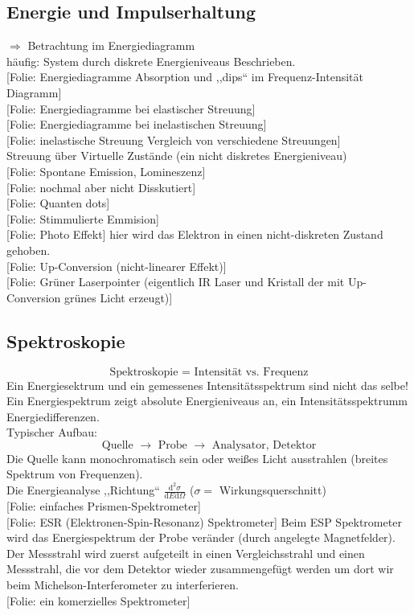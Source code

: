 \documentclass[titlepage,11pt,a4paper,ngerman]{report}
\newcommand{\tx}[1]{\textrm{#1}}
\newcommand{\dd}{\tx{d}}
\newcommand{\prd}[2]{\frac{\tx{d} #1}{\tx{d} #2}}
\newcommand{\folie}[1]{\color{gray}[Folie: #1]\color{black}}
\newcommand{\lcom}[1]{\color{MidnightBlue}#1\color{black}}
\begin{document}
\subsection{Energie und Impulserhaltung}
$ \Rightarrow $ Betrachtung im Energiediagramm\\[5pt]
häufig: System durch diskrete Energieniveaus Beschrieben.\\[5pt]
\folie{Energiediagramme Absorption und ,,dips`` im Frequenz-Intensität Diagramm}\\
\folie{Energiediagramme bei elastischer Streuung}\\
\folie{Energiediagramme bei inelastischen Streuung}\\
\folie{inelastische Streuung Vergleich von verschiedene Streuungen}\\
Streuung über Virtuelle Zustände (ein nicht diskretes Energieniveau)\\
\folie{Spontane Emission, Lomineszenz}\\
\folie{nochmal aber nicht Disskutiert}\\
\folie{Quanten dots}\\
\folie{Stimmulierte Emmision}\\
\folie{Photo Effekt} hier wird das Elektron in einen nicht-diskreten Zustand gehoben.\\
\folie{Up-Conversion (nicht-linearer Effekt)}\\
\folie{Grüner Laserpointer (eigentlich IR Laser und Kristall der mit Up-Conversion grünes Licht erzeugt)}\\


\subsection{Spektroskopie}

\begin{equation*}
\tx{Spektroskopie } = \tx{ Intensität vs. Frequenz}
\end{equation*}
\lcom{Ein Energiesektrum und ein gemessenes Intensitätsspektrum sind nicht das selbe! Ein Energiespektrum zeigt absolute Energieniveaus an, ein Intensitätsspektrumm Energiedifferenzen.}\\[5pt]
Typischer Aufbau:
\begin{equation*}
\tx{Quelle } \rightarrow \tx{ Probe } \rightarrow \tx{ Analysator, Detektor}
\end{equation*}
Die Quelle kann monochromatisch sein oder weißes Licht ausstrahlen (breites Spektrum von Frequenzen).\\
Die Energieanalyse ,,Richtung`` $ \prd{^2 \sigma}{E \dd \Omega} $ ($ \sigma = $ Wirkungsquerschnitt)\\
\folie{einfaches Prismen-Spektrometer}\\
\folie{ESR (Elektronen-Spin-Resonanz) Spektrometer}
\lcom{Beim ESP Spektrometer wird das Energiespektrum der Probe veränder (durch angelegte Magnetfelder). Der Messstrahl wird zuerst aufgeteilt in einen Vergleichsstrahl und einen Messstrahl, die vor dem Detektor wieder zusammengefügt werden um dort wir beim Michelson-Interferometer zu interferieren.}\\
\folie{ein komerzielles Spektrometer}
\end{document}
